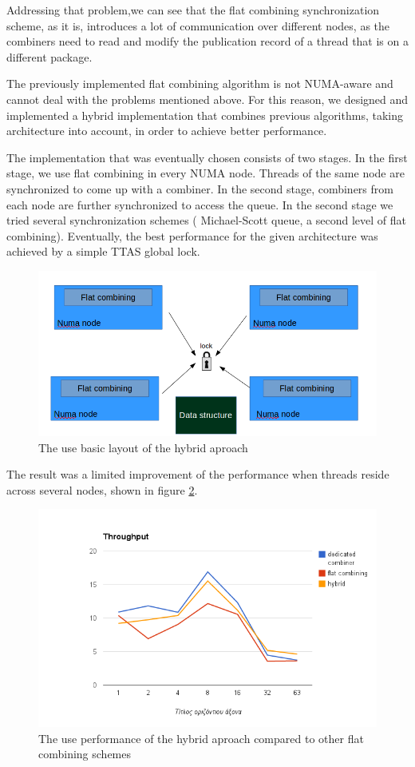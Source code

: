 Addressing that problem,we can see that the flat combining synchronization scheme, as it is, introduces a lot of communication over different nodes, as the combiners need to read and modify the publication record of a thread that is on a different package.


The previously implemented flat combining algorithm is not NUMA-aware and cannot deal with the problems mentioned above. For this reason, we designed and implemented a hybrid implementation that combines previous algorithms, taking architecture into account, in order to achieve better performance.

The implementation that was eventually chosen  consists of two stages. In the first stage, we use flat combining in every NUMA node. Threads of the same node are synchronized to come up with a combiner. In the second stage, combiners from each node are further synchronized to access the queue. In the second stage we tried several synchronization schemes ( Michael-Scott queue, a second level of flat combining). Eventually, the best performance for the given architecture was achieved by a simple TTAS global lock.

\begin{figure}
 \centering
  \includegraphics[scale=0.5]{queue_fc_hybrid_basic.png}
\caption{The use basic layout of the hybrid aproach}
\label{queue_fc_hybrid_basic}
\end{figure}

The result was a limited improvement of the performance when threads reside across several nodes, shown in figure \ref{queue_fc_hybrid_perf}.

 
\begin{figure}
 \centering
  \includegraphics[scale=0.7]{queue_fc_hybrid_perf.png}
\caption{The use performance of the hybrid aproach compared to other flat combining schemes}
\label{queue_fc_hybrid_perf}
\end{figure}

